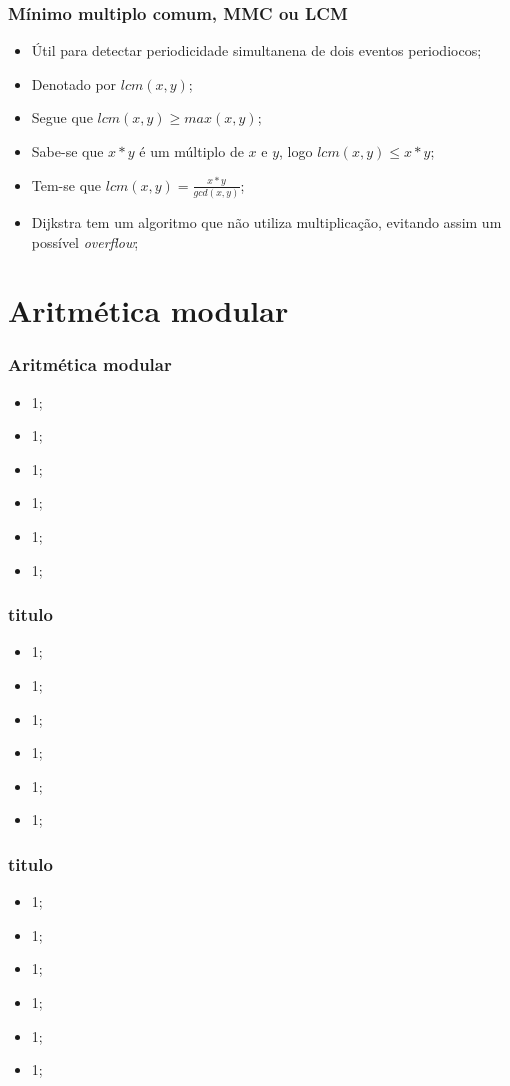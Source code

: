 \documentclass{beamer}
\begin{document}
\begin{frame}
    \frametitle{Mínimo multiplo comum, MMC ou LCM}

    \begin{itemize}
        \item Útil para detectar periodicidade simultanena de dois eventos periodiocos;
        \item Denotado por $lcm(x, y)$;
        \item Segue que $lcm(x, y) \geq max(x, y)$;
        \item Sabe-se que $x*y$ é um múltiplo de $x$ e $y$, logo $lcm(x, y) \leq x*y$;
        \item Tem-se que $lcm(x, y) = \frac{x*y}{gcd(x, y)}$;
        \item Dijkstra tem um algoritmo que não utiliza multiplicação, evitando assim um possível \textit{overflow};
    \end{itemize}
\end{frame}

\section{Aritmética modular}
\begin{frame}
    \frametitle{Aritmética modular}

    \begin{itemize}
        \item 1;
        \item 1;
        \item 1;
        \item 1;
        \item 1;
        \item 1;
    \end{itemize}
\end{frame}

\begin{frame}
    \frametitle{titulo}

    \begin{itemize}
        \item 1;
        \item 1;
        \item 1;
        \item 1;
        \item 1;
        \item 1;
    \end{itemize}
\end{frame}

\begin{frame}
    \frametitle{titulo}

    \begin{itemize}
        \item 1;
        \item 1;
        \item 1;
        \item 1;
        \item 1;
        \item 1;
    \end{itemize}
\end{frame}
\end{document}

